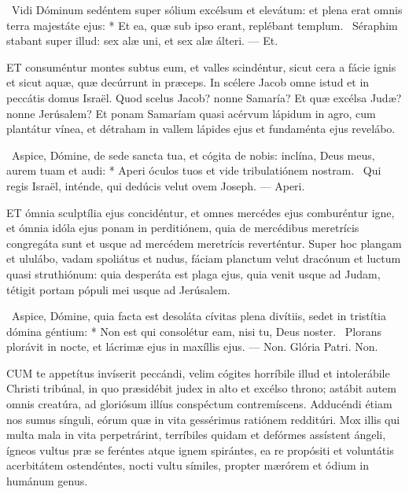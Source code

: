 \R\ Vidi Dóminum sedéntem super sólium excélsum et elevátum: et plena erat omnis terra majestáte ejus: * Et ea, quæ sub ipso erant, replébant templum. \V\ Séraphim stabant super illud: sex alæ uni, et sex alæ álteri. — Et.


\lettrine[lines=2]{E}{T} consuméntur montes subtus eum, et valles scindéntur, sicut cera a fácie ignis et sicut aquæ, quæ decúrrunt in præceps. In scélere Jacob omne istud et in peccátis domus Israël. Quod scelus Jacob? nonne Samaría? Et quæ excélsa Judæ? nonne Jerúsalem? Et ponam Samaríam quasi acérvum lápidum in agro, cum plantátur vínea, et détraham in vallem lápides ejus et fundaménta ejus revelábo.

\R\ Aspice, Dómine, de sede sancta tua, et cógita de nobis: inclína, Deus meus, aurem tuam et audi: * Aperi óculos tuos et vide tribulatiónem nostram. \V\ Qui regis Israël, inténde, qui dedúcis velut ovem Joseph. — Aperi.


\lettrine[lines=2]{E}{T} ómnia sculptília ejus concidéntur, et omnes mercédes ejus comburéntur igne, et ómnia idóla ejus ponam in perditiónem, quia de mercédibus meretrícis congregáta sunt et usque ad mercédem meretrícis reverténtur. Super hoc plangam et ululábo, vadam spoliátus et nudus, fáciam planctum velut dracónum et luctum quasi struthiónum: quia desperáta est plaga ejus, quia venit usque ad Judam, tétigit portam pópuli mei usque ad Jerúsalem.

\R\ Aspice, Dómine, quia facta est desoláta cívitas plena divítiis, sedet in tristítia dómina géntium: * Non est qui consolétur eam, nisi tu, Deus noster. \V\ Plorans plorávit in nocte, et lácrimæ ejus in maxíllis ejus. — Non. Glória Patri. Non.




\lettrine[lines=2]{C}{UM} te appetítus invíserit peccándi, velim cógites horríbile illud et intolerábile Christi tribúnal, in quo præsidébit judex in alto et excélso throno; astábit autem omnis creatúra, ad gloriósum illíus conspéctum contremíscens. Adducéndi étiam nos sumus sínguli, eórum quæ in vita gessérimus ratiónem redditúri. Mox illis qui multa mala in vita perpetrárint, terríbiles quidam et defórmes assístent ángeli, ígneos vultus præ se feréntes atque ignem spirántes, ea re propósiti et voluntátis acerbitátem ostendéntes, nocti vultu símiles, propter mærórem et ódium in humánum genus.

